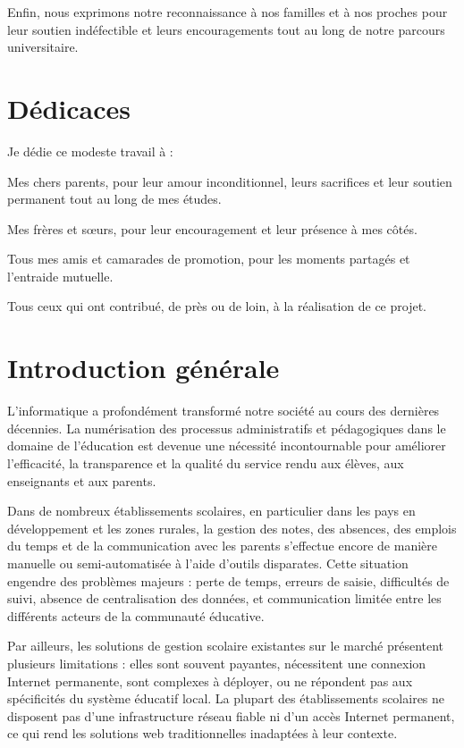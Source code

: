 \documentclass[12pt,a4paper,twoside]{report}
\begin{document}
Enfin, nous exprimons notre reconnaissance à nos familles et à nos proches pour leur soutien indéfectible et leurs encouragements tout au long de notre parcours universitaire.

\chapter*{Dédicaces}

Je dédie ce modeste travail à :

Mes chers parents, pour leur amour inconditionnel, leurs sacrifices et leur soutien permanent tout au long de mes études.

Mes frères et sœurs, pour leur encouragement et leur présence à mes côtés.

Tous mes amis et camarades de promotion, pour les moments partagés et l'entraide mutuelle.

Tous ceux qui ont contribué, de près ou de loin, à la réalisation de ce projet.

\tableofcontents
\listoffigures
\listoftables

\chapter*{Introduction générale}

L'informatique a profondément transformé notre société au cours des dernières décennies. La numérisation des processus administratifs et pédagogiques dans le domaine de l'éducation est devenue une nécessité incontournable pour améliorer l'efficacité, la transparence et la qualité du service rendu aux élèves, aux enseignants et aux parents.

Dans de nombreux établissements scolaires, en particulier dans les pays en développement et les zones rurales, la gestion des notes, des absences, des emplois du temps et de la communication avec les parents s'effectue encore de manière manuelle ou semi-automatisée à l'aide d'outils disparates. Cette situation engendre des problèmes majeurs : perte de temps, erreurs de saisie, difficultés de suivi, absence de centralisation des données, et communication limitée entre les différents acteurs de la communauté éducative.

Par ailleurs, les solutions de gestion scolaire existantes sur le marché présentent plusieurs limitations : elles sont souvent payantes, nécessitent une connexion Internet permanente, sont complexes à déployer, ou ne répondent pas aux spécificités du système éducatif local. La plupart des établissements scolaires ne disposent pas d'une infrastructure réseau fiable ni d'un accès Internet permanent, ce qui rend les solutions web traditionnelles inadaptées à leur contexte.
\end{document}
